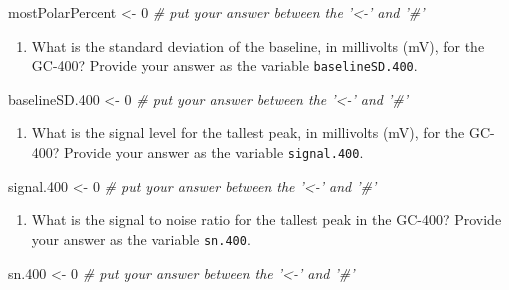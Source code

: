 \documentclass[]{tufte-book}
\newenvironment{Shaded}{}{}
\newcommand{\CommentTok}[1]{\textcolor[rgb]{0.38,0.63,0.69}{\textit{#1}}}
\newcommand{\DecValTok}[1]{\textcolor[rgb]{0.25,0.63,0.44}{#1}}
\newcommand{\FloatTok}[1]{\textcolor[rgb]{0.25,0.63,0.44}{#1}}
\newcommand{\NormalTok}[1]{#1}
\newcommand{\StringTok}[1]{\textcolor[rgb]{0.25,0.44,0.63}{#1}}
\providecommand{\tightlist}{%
  \setlength{\itemsep}{0pt}\setlength{\parskip}{0pt}}
\begin{document}
\begin{Shaded}
\begin{Highlighting}[]
\NormalTok{mostPolarPercent <-}\StringTok{ }\DecValTok{0}    \CommentTok{# put your answer between the '<-' and '#'}
\end{Highlighting}
\end{Shaded}

\begin{enumerate}
\def\labelenumi{\arabic{enumi}.}
\setcounter{enumi}{8}
\tightlist
\item
  What is the standard deviation of the baseline, in millivolts (mV), for the GC-400? Provide your answer as the variable \texttt{baselineSD.400}.
\end{enumerate}

\begin{Shaded}
\begin{Highlighting}[]
\NormalTok{baselineSD}\FloatTok{.400}\NormalTok{ <-}\StringTok{ }\DecValTok{0}    \CommentTok{# put your answer between the '<-' and '#'}
\end{Highlighting}
\end{Shaded}

\begin{enumerate}
\def\labelenumi{\arabic{enumi}.}
\setcounter{enumi}{9}
\tightlist
\item
  What is the signal level for the tallest peak, in millivolts (mV), for the GC-400? Provide your answer as the variable \texttt{signal.400}.
\end{enumerate}

\begin{Shaded}
\begin{Highlighting}[]
\NormalTok{signal}\FloatTok{.400}\NormalTok{ <-}\StringTok{ }\DecValTok{0}    \CommentTok{# put your answer between the '<-' and '#'}
\end{Highlighting}
\end{Shaded}

\begin{enumerate}
\def\labelenumi{\arabic{enumi}.}
\setcounter{enumi}{10}
\tightlist
\item
  What is the signal to noise ratio for the tallest peak in the GC-400? Provide your answer as the variable \texttt{sn.400}.
\end{enumerate}

\begin{Shaded}
\begin{Highlighting}[]
\NormalTok{sn}\FloatTok{.400}\NormalTok{ <-}\StringTok{ }\DecValTok{0}    \CommentTok{# put your answer between the '<-' and '#'}
\end{Highlighting}
\end{Shaded}
\end{document}
